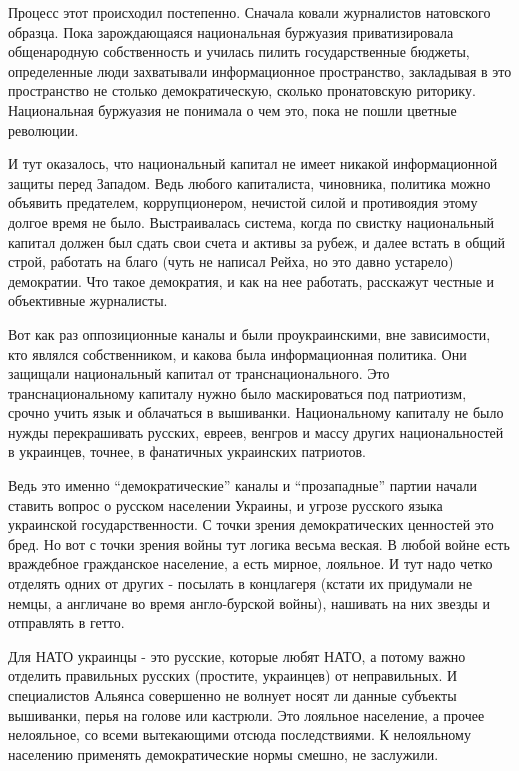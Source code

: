 Процесс этот происходил постепенно. Сначала ковали журналистов натовского
образца. Пока зарождающаяся национальная буржуазия приватизировала общенародную
собственность и училась пилить государственные бюджеты, определенные люди
захватывали информационное пространство, закладывая в это пространство не
столько демократическую, сколько пронатовскую риторику. Национальная буржуазия
не понимала о чем это, пока не пошли цветные революции. 

И тут оказалось, что национальный капитал не имеет никакой информационной
защиты перед Западом. Ведь любого капиталиста, чиновника, политика можно
объявить предателем, коррупционером, нечистой силой и противоядия этому долгое
время не было. Выстраивалась система, когда по свистку национальный капитал
должен был сдать свои счета и активы за рубеж, и далее встать в общий строй,
работать на благо (чуть не написал Рейха, но это давно устарело) демократии.
Что такое демократия, и как на нее работать, расскажут честные и объективные
журналисты. 

Вот как раз оппозиционные каналы и были проукраинскими, вне зависимости, кто
являлся собственником, и какова была информационная политика. Они защищали
национальный капитал от транснационального. Это транснациональному капиталу
нужно было маскироваться под патриотизм, срочно учить язык и облачаться в
вышиванки. Национальному капиталу не было нужды перекрашивать русских, евреев,
венгров и массу других национальностей в украинцев, точнее, в фанатичных
украинских патриотов. 

Ведь это именно \enquote{демократические} каналы и \enquote{прозападные} партии
начали ставить вопрос о русском населении Украины, и угрозе русского языка
украинской государственности. С точки зрения демократических ценностей это
бред. Но вот с точки зрения войны тут логика весьма веская. В любой войне есть
враждебное гражданское население, а есть мирное, лояльное. И тут надо четко
отделять одних от других - посылать в концлагеря (кстати их придумали не немцы,
а англичане во время англо-бурской войны), нашивать на них звезды и отправлять
в гетто. 

Для НАТО украинцы - это русские, которые любят НАТО, а потому важно отделить
правильных русских (простите, украинцев) от неправильных. И специалистов
Альянса совершенно не волнует носят ли данные субъекты вышиванки, перья на
голове или кастрюли. Это лояльное население, а прочее нелояльное, со всеми
вытекающими отсюда последствиями. К нелояльному населению применять
демократические нормы смешно, не заслужили. 

